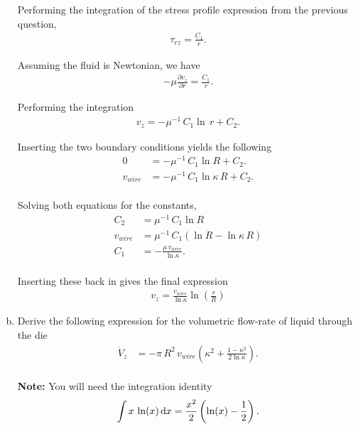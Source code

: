 \documentclass[calculator,datasheet,handbook]{exam}
\begin{document}
\begin{question}
\begin{enumerate}[a)]
{      Performing the integration of the stress profile expression from
      the previous question,
      \begin{align*}
        \tau_{rz} = \frac{C_1}{r}.
      \end{align*}
      
      Assuming the fluid is Newtonian, we have
      \begin{align*}
        -\mu \frac{\partial v_z}{\partial r} = \frac{C_1}{r}.
      \end{align*}

      Performing the integration
      \begin{align*}
        v_z = -\mu^{-1}\,C_1\ln\,r+C_2.
      \end{align*}
      
      Inserting the two boundary conditions yields the following
      \begin{align*}
        0 &= -\mu^{-1}\,C_1\ln R+C_2.\\
        v_{wire} &= -\mu^{-1}\,C_1\ln \kappa\,R+C_2.\\
      \end{align*}

      Solving both equations for the constants,
      \begin{align*}
        C_2 &= \mu^{-1}\,C_1\ln R\\
        v_{wire} &= \mu^{-1}\,C_1(\ln R-\ln \kappa\,R)\\
        C_1 &= -\frac{\mu\,v_{wire}}{\ln \kappa}.\\
      \end{align*}

      Inserting these back in gives the final expression
      \begin{align*}
        v_z = \frac{v_{wire}}{\ln \kappa}\ln\left(\frac{r}{R}\right)
      \end{align*}
    } 
  \item Derive the following expression for the volumetric flow-rate of liquid
    through the die
    \begin{align*}
      \dot{V}_z &= -\pi\,R^2\,v_{wire}\left({\kappa^2}+\frac{1-\kappa^2}{2\ln \kappa}\right).
    \end{align*}
    \\{\bf Note:} You will need the integration identity
    \begin{align*}
      \int x\,\ln(x)\,{\rm d}x = \frac{x^2}{2}\left(\ln(x) - \frac{1}{2}\right).
    \end{align*}
\end{enumerate}
\end{question}
\end{document}
